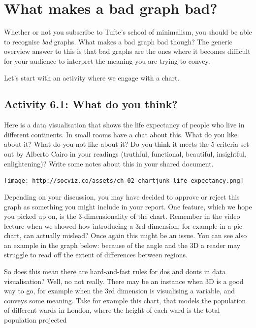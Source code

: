 \documentclass[
]{book}
\begin{document}
\hypertarget{what-makes-a-bad-graph-bad}{%
\section{What makes a bad graph bad?}\label{what-makes-a-bad-graph-bad}}

Whether or not you subscribe to Tufte's school of minimalism, you should be able to recognise \emph{bad} graphs. What makes a bad graph bad though? The generic overview answer to this is that bad graphs are the ones where it becomes difficult for your audience to interpret the meaning you are trying to convey.

Let's start with an activity where we engage with a chart.

\hypertarget{activity-6.1-what-do-you-think}{%
\subsection{Activity 6.1: What do you think?}\label{activity-6.1-what-do-you-think}}

Here is a data visualisation that shows the life expectancy of people who live in different continents. In small rooms have a chat about this. What do you like about it? What do you not like about it? Do you think it meets the 5 criteria set out by Alberto Cairo in your readings (truthful, functional, beautiful, insightful, enlightening)? Write some notes about this in your shared document.

\texttt{[image: http://socviz.co/assets/ch-02-chartjunk-life-expectancy.png]}

Depending on your discussion, you may have decided to approve or reject this graph as something you might include in your report. One feature, which we hope you picked up on, is the 3-dimensionality of the chart. Remember in the video lecture when we showed how introducing a 3rd dimension, for example in a pie chart, can actually mislead? Once again this might be an issue. You can see also an example in the graph below: because of the angle and the 3D a reader may struggle to read off the extent of differences between regions.

So does this mean there are hard-and-fast rules for dos and donts in data visualisation? Well, no not really. There may be an instance when 3D is a good way to go, for example when the 3rd dimension is visualising a variable, and conveys some meaning. Take for example this chart, that models the population of different wards in London, where the height of each ward is the total population projected
\end{document}
